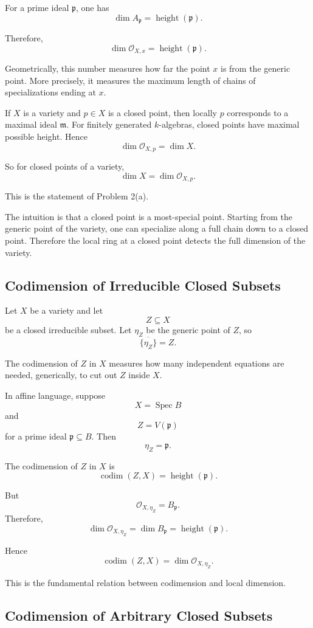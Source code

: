 \documentclass[12pt,a4paper]{article}
\DeclareMathOperator{\Spec}{Spec}
\newcommand{\codim}{\operatorname{codim}}
\newcommand{\height}{\operatorname{height}}
\providecommand{\Spec}{\operatorname{Spec}}
\theoremstyle{notespace}
\begin{document}
For a prime ideal \(\mathfrak p\), one has
\[
\dim A_{\mathfrak p}=\height(\mathfrak p).
\]

Therefore,
\[
\boxed{
	\dim \mathcal O_{X,x}=\height(\mathfrak p).
}
\]

Geometrically, this number measures how far the point \(x\) is from the generic point. More precisely, it measures the maximum length of chains of specializations ending at \(x\).

If \(X\) is a variety and \(p\in X\) is a closed point, then locally \(p\) corresponds to a maximal ideal \(\mathfrak m\). For finitely generated \(k\)-algebras, closed points have maximal possible height. Hence
\[
\dim \mathcal O_{X,p}=\dim X.
\]

So for closed points of a variety,
\[
\boxed{
	\dim X=\dim \mathcal O_{X,p}.
}
\]

This is the statement of Problem 2(a).

The intuition is that a closed point is a most-special point. Starting from the generic point of the variety, one can specialize along a full chain down to a closed point. Therefore the local ring at a closed point detects the full dimension of the variety.

\subsection{Codimension of Irreducible Closed Subsets}

Let \(X\) be a variety and let
\[
Z\subseteq X
\]
be a closed irreducible subset. Let \(\eta_Z\) be the generic point of \(Z\), so
\[
\overline{\{\eta_Z\}}=Z.
\]

The codimension of \(Z\) in \(X\) measures how many independent equations are needed, generically, to cut out \(Z\) inside \(X\).

In affine language, suppose
\[
X=\Spec B
\]
and
\[
Z=V(\mathfrak p)
\]
for a prime ideal \(\mathfrak p\subseteq B\). Then
\[
\eta_Z=\mathfrak p.
\]

The codimension of \(Z\) in \(X\) is
\[
\codim(Z,X)=\height(\mathfrak p).
\]

But
\[
\mathcal O_{X,\eta_Z}=B_{\mathfrak p}.
\]
Therefore,
\[
\dim \mathcal O_{X,\eta_Z}
=
\dim B_{\mathfrak p}
=
\height(\mathfrak p).
\]

Hence
\[
\boxed{
	\codim(Z,X)=\dim \mathcal O_{X,\eta_Z}.
}
\]

This is the fundamental relation between codimension and local dimension.

\subsection{Codimension of Arbitrary Closed Subsets}
\end{document}
